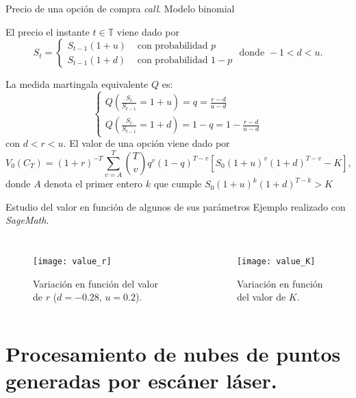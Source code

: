 \documentclass[9pt]{beamer}
\begin{document}
	\begin{frame}{Precio de una opción de compra \textit{call}. Modelo binomial}
		
	El precio el instante $ t \in \mathbb{T} $ viene dado por
	\[
	S_t =  \begin{cases}
	S_{t-1}(1+u) & \text{ con probabilidad } p\\
	S_{t-1}(1+d) & \text{ con probabilidad } 1-p
	\end{cases} \text{ donde }-1 < d <u.
	\]
		
	La medida martingala equivalente $ Q $ es:
	\[
	\begin{cases}
	Q (\frac{S_t}{S_{t-1}} = 1+u ) =  q = \frac{r-d}{u-d} \\
	Q (\frac{S_t}{S_{t-1}} = 1+d ) =  1-q =  1- \frac{r-d}{u-d}
	\end{cases}
	\]
	con $ d < r < u $. El valor de una opción viene dado por
	\begin{equation*}
	V_0(C_T) = (1+r)^{-T} \sum_{v=A}^{T}\binom{T}{v}q^v(1-q)^{T-v}\left[S_0(1+u)^v(1+d)^{T-v}-K\right],
	\end{equation*}
	donde $ A $ denota el primer entero $ k $ que cumple $ S_0(1+u)^k(1+d)^{T-k} > K $
	
	\end{frame}
	
	\begin{frame}{Estudio del valor en función de algunos de sus parámetros}
		Ejemplo realizado con \textit{SageMath}.
		\begin{columns}
			\begin{figure}[h!]
				\texttt{[image: value\_r]}
				\caption{Variación en función del valor de $ r $ ($ d= -0.28 $, $ u=0.2 $).}
			\end{figure}
			\begin{figure}[h!]
				\texttt{[image: value\_K]}
				\caption{Variación en función del valor de $ K $.}
			\end{figure} 
		\end{columns}
	\end{frame}
	
	\section[Procesamiento de nubes de puntos generadas por escáner láser]{Procesamiento de nubes de puntos generadas por escáner láser.}
\end{document}
